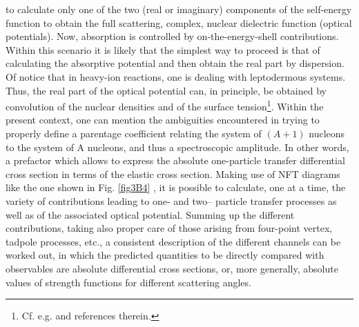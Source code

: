 to calculate only one of the two (real or imaginary)
components of the self-energy function to obtain the
full scattering, complex, nuclear dielectric function
(optical potentials). Now, absorption is controlled
by on-the-energy-shell contributions. Within this
scenario it is likely that the simplest way to proceed is
that of calculating the absorptive potential and then
obtain the real part by dispersion. Of notice that in heavy-ion reactions,
one is dealing with leptodermous systems. Thus, the
real part of the optical potential can, in principle, be
obtained by convolution of the nuclear densities and
of the surface tension\footnote{Cf. e.g. \cite{Broglia:05c} and references therein.}. Within the present context, one can mention the
ambiguities encountered in trying to properly define
a parentage coefficient relating the system of $(A +
1)$ nucleons to the system of A nucleons, and thus
a spectroscopic amplitude. In other words, a prefactor which allows to express the absolute one-particle transfer differential
cross section in terms of the elastic cross section.
Making use of NFT diagrams like the one shown
in Fig. \ref{fig3B4} , it is possible to calculate, one at a time,
the variety of contributions leading to one- and two-- particle
transfer processes as well as of the associated optical potential. Summing up the different
contributions, taking also proper care of those arising
from four-point vertex, tadpole processes, etc., a
consistent description of the different channels can be
worked out, in which the predicted quantities to be
directly compared with observables are absolute differential
cross sections, or, more generally, absolute
values of strength functions for different scattering
angles.
